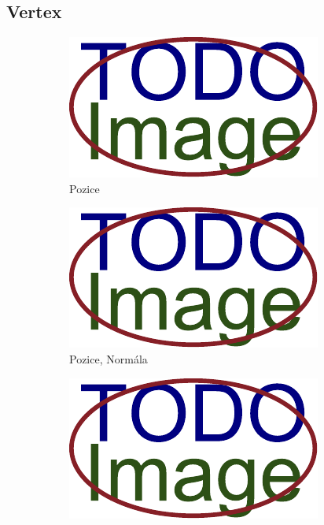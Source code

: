 \subsection{Vertex}\label{ch:teorie:opengl:vertex}

\begin{figure}[H]
	\centering
	\begin{subfigure}{0.32\textwidth}
		\includegraphics[width=\textwidth]{obrazky-figures/placeholder.pdf}
		\caption{Pozice}
		\label{fig:opengl:vertex:p}
	\end{subfigure}
	\hfill
	\begin{subfigure}{0.32\textwidth}
		\includegraphics[width=\textwidth]{obrazky-figures/placeholder.pdf}
		\caption{Pozice, Normála}
		\label{fig:opengl:vertex:pn}
	\end{subfigure}
	\hfill
	\begin{subfigure}{0.32\textwidth}
		\includegraphics[width=\textwidth]{obrazky-figures/placeholder.pdf}

\end{subfigure}
\end{figure}
